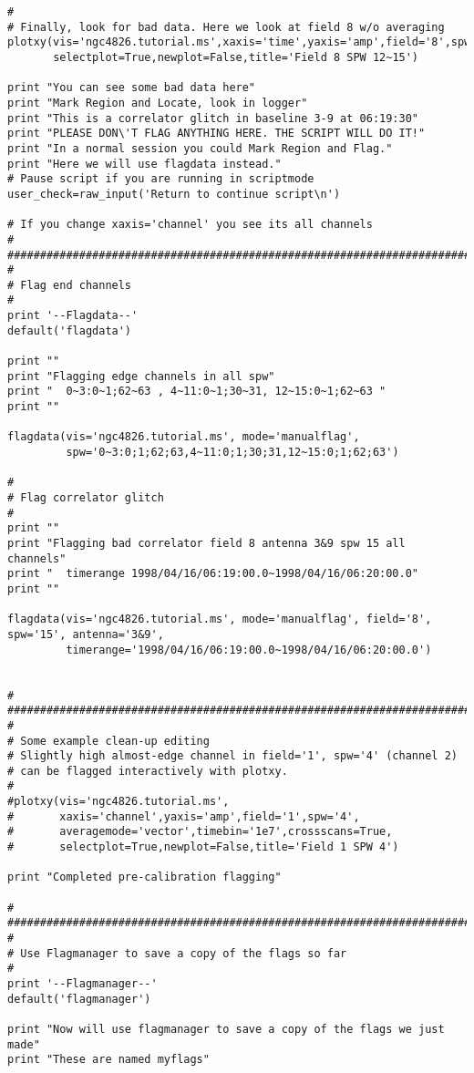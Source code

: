 \begin{verbatim}
#
# Finally, look for bad data. Here we look at field 8 w/o averaging
plotxy(vis='ngc4826.tutorial.ms',xaxis='time',yaxis='amp',field='8',spw='12~15',
       selectplot=True,newplot=False,title='Field 8 SPW 12~15')

print "You can see some bad data here"
print "Mark Region and Locate, look in logger"
print "This is a correlator glitch in baseline 3-9 at 06:19:30"
print "PLEASE DON\'T FLAG ANYTHING HERE. THE SCRIPT WILL DO IT!"
print "In a normal session you could Mark Region and Flag."
print "Here we will use flagdata instead."
# Pause script if you are running in scriptmode
user_check=raw_input('Return to continue script\n')

# If you change xaxis='channel' you see its all channels
#
##########################################################################
#
# Flag end channels
#
print '--Flagdata--'
default('flagdata')

print ""
print "Flagging edge channels in all spw"
print "  0~3:0~1;62~63 , 4~11:0~1;30~31, 12~15:0~1;62~63 "
print ""

flagdata(vis='ngc4826.tutorial.ms', mode='manualflag',
         spw='0~3:0;1;62;63,4~11:0;1;30;31,12~15:0;1;62;63')

#
# Flag correlator glitch
#
print ""
print "Flagging bad correlator field 8 antenna 3&9 spw 15 all channels"
print "  timerange 1998/04/16/06:19:00.0~1998/04/16/06:20:00.0"
print ""

flagdata(vis='ngc4826.tutorial.ms', mode='manualflag', field='8', spw='15', antenna='3&9', 
         timerange='1998/04/16/06:19:00.0~1998/04/16/06:20:00.0')


#
##########################################################################
#
# Some example clean-up editing
# Slightly high almost-edge channel in field='1', spw='4' (channel 2)
# can be flagged interactively with plotxy.
#
#plotxy(vis='ngc4826.tutorial.ms',
#       xaxis='channel',yaxis='amp',field='1',spw='4',
#       averagemode='vector',timebin='1e7',crossscans=True,
#       selectplot=True,newplot=False,title='Field 1 SPW 4')

print "Completed pre-calibration flagging"

#
##########################################################################
#
# Use Flagmanager to save a copy of the flags so far
#
print '--Flagmanager--'
default('flagmanager')

print "Now will use flagmanager to save a copy of the flags we just made"
print "These are named myflags"


\end{verbatim}
